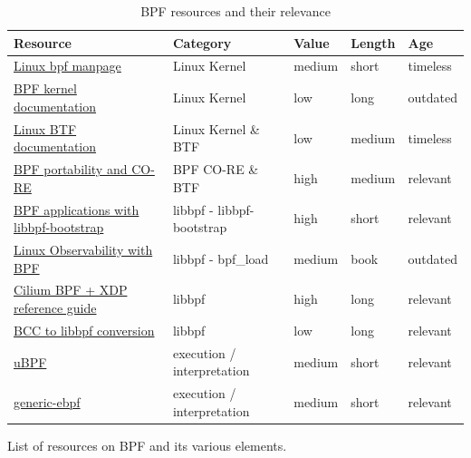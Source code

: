\documentclass[conference]{IEEEtran}
\begin{document}
\begin{table}[h!]
	\caption{BPF resources and their relevance}
	\label{table:bpfresources}
	\centering
	\begin{adjustbox}{width=0.5\textwidth}
		\begin{threeparttable}[]
			\begin{tabular}{lllll}
				\toprule
				\textbf{Resource} & \textbf{Category} & \textbf{Value} &
				\textbf{Length} & \textbf{Age} \\
				\midrule
				\href{https://www.man7.org/linux/man-pages/man2/bpf.2.html}{Linux bpf manpage}\cite{bpfman} &
				Linux Kernel & medium & short & timeless \\
				\href{https://www.kernel.org/doc/Documentation/networking/filter.txt}{BPF kernel documentation}\cite{Linuxbpf} &
				Linux Kernel & low & long & outdated \\
				\href{https://www.kernel.org/doc/html/latest/bpf/btf.html}{Linux BTF documentation}\cite{Linuxbtf} &
				Linux Kernel \& BTF & low & medium & timeless \\
				\href{https://facebookmicrosites.github.io/bpf/blog/2020/02/19/bpf-portability-and-co-re.html}{BPF portability and CO-RE}\cite{bpfport} &
				BPF CO-RE \& BTF & high & medium & relevant \\
				\href{https://nakryiko.com/posts/libbpf-bootstrap/}{BPF applications with libbpf-bootstrap}\cite{bpfapplications} &
				libbpf - libbpf-bootstrap & high & short & relevant \\
				\href{https://www.oreilly.com/library/view/linux-observability-with/9781492050193/}{Linux Observability with BPF}\cite{observabilityoreilly} &
				libbpf - bpf\_load & medium & book & outdated \\
				\href{https://facebookmicrosites.github.io/bpf/blog/2020/02/19/bpf-portability-and-co-re.html}{Cilium BPF + XDP reference guide}\cite{ciliumbpf} &
				libbpf & high & long & relevant \\
				\href{https://facebookmicrosites.github.io/bpf/blog/2020/02/20/bcc-to-libbpf-howto-guide.html}{BCC to libbpf conversion}\cite{libbpfconversion} &
				libbpf & low & long & relevant \\
				\href{https://github.com/iovisor/ubpf}{uBPF}\cite{ubpf} &
				execution / interpretation & medium & short & relevant \\
				\href{https://github.com/generic-ebpf/generic-ebpf}{generic-ebpf}\cite{generic-ebpf} &
				execution / interpretation & medium & short & relevant \\
				\bottomrule
			\end{tabular}
			\begin{tablenotes}
				\centering List of resources on BPF and its various elements.
			\end{tablenotes}
		\end{threeparttable}
	\end{adjustbox}
\end{table}
\end{document}
